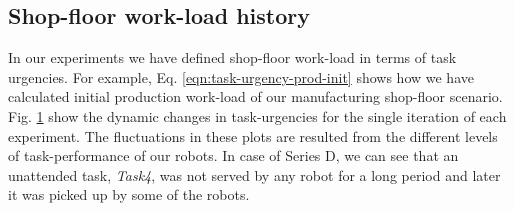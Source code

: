 \documentclass[final,5p,times,twocolumn]{elsarticle}
\begin{document}
\subsection*{Shop-floor work-load history}
In our experiments we have defined shop-floor work-load in terms of task urgencies. For example, Eq. \ref{eqn:task-urgency-prod-init} shows how we have calculated initial production work-load of our manufacturing shop-floor scenario. Fig. \ref{fig:raw-urgencies}  show the dynamic changes in task-urgencies for the single iteration of each experiment. The fluctuations in these plots are resulted from the different levels of task-performance of our robots. In case of Series D, we can see that an unattended task, \textit{Task4}, was not served by any robot for a long period and later it was picked up by some of the robots. 
\begin{figure} 
\label{fig:raw-urgencies}
\centering
{}
\newline
{}

\end{figure}
\end{document}
